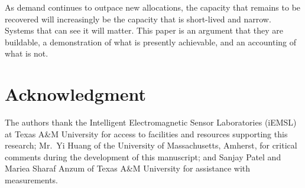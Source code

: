 \documentclass[lettersize,journal]{IEEEtran}
\begin{document}
As demand continues to outpace new allocations, the capacity that
remains to be recovered will increasingly be the capacity that is
short-lived and narrow. Systems that can see it will matter. This paper
is an argument that they are buildable, a demonstration of what is
presently achievable, and an accounting of what is not.

\section*{\textbf{Acknowledgment}}
The authors thank the Intelligent Electromagnetic Sensor Laboratories
(iEMSL) at Texas A\&M University for access to facilities and resources
supporting this research; Mr.\ Yi Huang of the University of
Massachusetts, Amherst, for critical comments during the development of
this manuscript; and Sanjay Patel and Mariea Sharaf Anzum of Texas A\&M
University for assistance with measurements.
\end{document}
